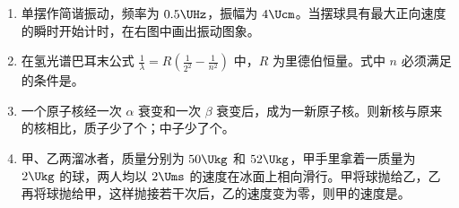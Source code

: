\documentclass[\gkver]{gaokaozhenti}
\begin{document}
\begin{enumerate}
\item
单摆作简谐振动，频率为 $0.5\UHz$，振幅为 $4\Ucm$。当摆球具有最大正向速度的瞬时开始计时，在右图中画出振动图象。
\onepicture[align=right, w=5.37cm]{}



\item
在氢光谱巴耳末公式 $\frac{1}{\lambda}=R\left(\frac{1}{2^{2}}-\frac{1}{n^{2}}\right)$ 中，$R$ 为里德伯恒量。式中 $n$ 必须满足的条件是。



\item
一个原子核经一次 $\alpha$ 衰变和一次 $\beta$ 衰变后，成为一新原子核。则新核与原来的核相比，质子少了个；中子少了个。



\item
甲、乙两溜冰者，质量分别为 $50\Ukg$ 和 $52\Ukg$，甲手里拿着一质量为 $2\Ukg$ 的球，两人均以 $2\Ums$ 的速度在冰面上相向滑行。甲将球抛给乙，乙再将球抛给甲，这样抛接若干次后，乙的速度变为零，则甲的速度是。



\end{enumerate}
\end{document}
